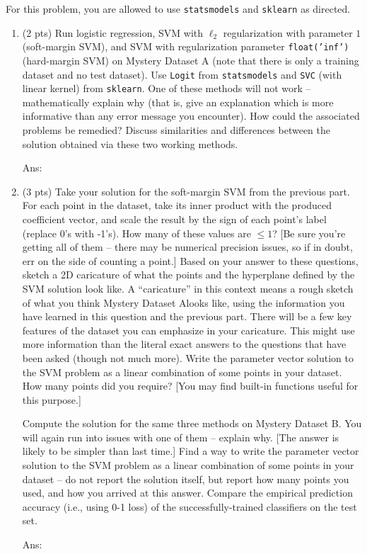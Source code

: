 \documentclass[10pt,letter,notitlepage]{article}
\newcommand{\red}[1]{{\color{red}#1}}
\newcommand{\ans}[1]{{\color{orange}\textsf{Ans}: #1}}
\newcounter{exercise}
\begin{document}
\begin{exercise}
For this problem, you are allowed to use \texttt{statsmodels} and \texttt{sklearn} as directed.
\begin{enumerate}
\item (2 pts) Run logistic regression, SVM with $\ell_2$ regularization with parameter $1$ (soft-margin SVM), and SVM with regularization parameter \texttt{float('inf')} (hard-margin SVM) on Mystery Dataset A (note that there is only a training dataset and no test dataset). Use \texttt{Logit} from \texttt{statsmodels} and \texttt{SVC} (with linear kernel) from \texttt{sklearn}.
One of these methods will not work -- mathematically explain why (that is, give an explanation which is more informative than any error message you encounter).
How could the associated problems be remedied?
Discuss similarities and differences between the solution obtained via these \red{two working} methods. 

\ans{} 

\item (3 pts) Take your solution for the soft-margin SVM from the previous part.
For each point in the dataset, take its inner product with the produced coefficient vector, and scale the result by the sign of each point's label (replace 0's with -1's). How many of these values are $\leq 1$? [Be sure you're getting all of them -- there may be numerical precision issues, so if in doubt, err on the side of counting a point.]
Based on your answer to these questions, sketch a 2D caricature of what the points and the hyperplane defined by the SVM solution look like.
    \red{A ``caricature'' in this context means a rough sketch of what you think Mystery Dataset Alooks like, using the information you have learned in this question and the previous part. 
    There will be a few key features of the dataset you can emphasize in your caricature.
    This might use more information than the literal exact answers to the questions that have been asked (though not much more).
    } 
Write the parameter vector solution to the SVM problem as a linear combination of some points in your dataset.
How many points did you require?
[You may find built-in functions useful for this purpose.]

Compute the solution for the same three methods on Mystery Dataset B. 
You will again run into issues with one of them -- explain why. [The answer is likely to be simpler than last time.]
Find a way to write the parameter vector solution to the SVM problem as a linear combination of some points in your dataset -- do not report the solution itself, but report how many points you used, and how you arrived at this answer.
Compare the empirical prediction accuracy (i.e., using 0-1 loss) of the successfully-trained classifiers on the test set. 

\ans{} 

\end{enumerate}
\end{exercise}
\end{document}
